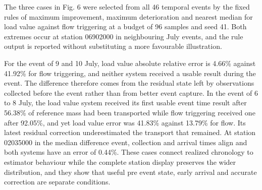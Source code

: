 \documentclass[pdflatex,sn-mathphys-num]{sn-jnl}%
\theoremstyle{thmstyleone}%
\theoremstyle{thmstyletwo}%
\theoremstyle{thmstylethree}%
\begin{document}
The three cases in Fig. 6 were selected from all 46 temporal events by the fixed rules of maximum improvement, maximum deterioration and nearest median for load value against flow triggering at a budget of 96 samples and seed 41. Both extremes occur at station 06902000 in neighbouring July events, and the rule output is reported without substituting a more favourable illustration.

For the event of 9 and 10 July, load value absolute relative error is 4.66\% against 41.92\% for flow triggering, and neither system received a usable result during the event. The difference therefore comes from the residual state left by observations collected before the event rather than from better event capture. In the event of 6 to 8 July, the load value system received its first usable event time result after 56.38\% of reference mass had been transported while flow triggering received one after 92.05\%, and yet load value error was 41.83\% against 13.79\% for flow. Its latest residual correction underestimated the transport that remained. At station 02035000 in the median difference event, collection and arrival times align and both systems have an error of 0.44\%. These cases connect realized chronology to estimator behaviour while the complete station display preserves the wider distribution, and they show that useful pre event state, early arrival and accurate correction are separate conditions.
\end{document}
